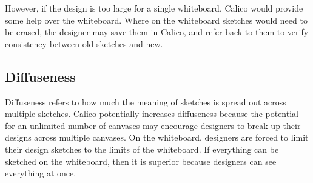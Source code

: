 \documentclass[12pt,fleqn]{ucithesis}
\begin{document}
However, if the design is too large for a single whiteboard, Calico would provide some help over the whiteboard. Where on the whiteboard sketches would need to be erased, the designer may save them in Calico, and refer back to them to verify consistency between old sketches and new.


\subsection{Diffuseness}

%
%
%

Diffuseness refers to how much the meaning of sketches is spread out across multiple sketches. Calico potentially increases diffuseness because the potential for an unlimited number of canvases may encourage designers to break up their designs across multiple canvases. On the whiteboard, designers are forced to limit their design sketches to the limits of the whiteboard.  If everything can be sketched on the whiteboard, then it is superior because designers can see everything at once. 
\end{document}
